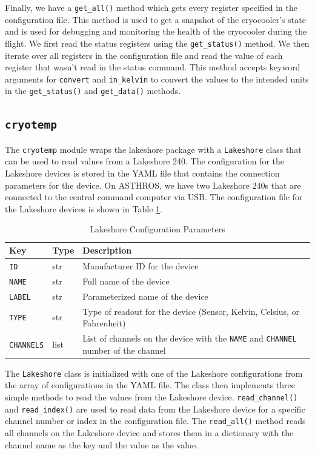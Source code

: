 Finally, we have a \texttt{get\_all()} method which gets every register specified in the configuration file.
This method is used to get a snapshot of the cryocooler's state and is used for debugging and monitoring the health of the cryocooler during the flight. 
We first read the status registers using the \texttt{get\_status()} method.
We then iterate over all registers in the configuration file and read the value of each register
that wasn't read in the status command.
This method accepts keyword arguments for \texttt{convert} and \texttt{in\_kelvin} to convert the values to the intended units in the \texttt{get\_status()} and \texttt{get\_data()} methods.

\subsection{\texttt{cryotemp}}
The \texttt{cryotemp} module wraps the lakeshore package with a \texttt{Lakeshore} class that can be used to read values from a Lakeshore 240. 
The configuration for the Lakeshore devices is stored in the YAML file that contains the connection parameters for the device.
On ASTHROS, we have two Lakeshore 240s that are connected to the central command computer via USB.
The configuration file for the Lakeshore devices is shown in Table \ref{readout/table:lakeshore_config}.

\begin{table}
    \centering
    \begin{tabularx}{\textwidth}{l|l|X}
        \textbf{Key} & \textbf{Type} & \textbf{Description} \\ \hline    
        \texttt{ID} & str & Manufacturer ID for the device \\
        \texttt{NAME} & str & Full name of the device \\
        \texttt{LABEL} & str & Parameterized name of the device \\
        \texttt{TYPE} & str & Type of readout for the device (Sensor, Kelvin, Celsius, or Fahrenheit) \\
        \texttt{CHANNELS} & list & List of channels on the device with the \texttt{NAME} and \texttt{CHANNEL} number of the channel
    \end{tabularx}
    \caption{Lakeshore Configuration Parameters}
    \label{readout/table:lakeshore_config}
\end{table}

The \texttt{Lakeshore} class is initialized with one of the Lakeshore configurations from the array of configurations in the YAML file.
The class then implements three simple methods to read the values from the Lakeshore device.
\texttt{read\_channel()} and \texttt{read\_index()} are used to read data from the Lakeshore device for a specific channel number or index in the configuration file.
The \texttt{read\_all()} method reads all channels on the Lakeshore device and stores them in a dictionary with the channel name as the key and the value as the value.

